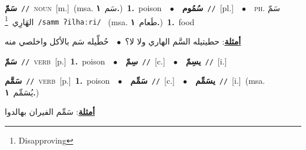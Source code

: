\documentclass[10pt,a4paper,twoside]{article} %
\begin{document}
\begin{multicols}{2}
{\setlength\topsep{0pt}\textbf{\foreignlanguage{arabic}{سَمّ}}\ {\color{gray}\texttt{//}\color{black}}\ \textsc{noun}\ [m.]\ \color{gray}(msa. \foreignlanguage{arabic}{سَم}~\foreignlanguage{arabic}{\textbf{١.}})\color{black}\ \textbf{1.}~poison\ \ $\bullet$\ \ \setlength\topsep{0pt}\textbf{\foreignlanguage{arabic}{سُمُوم}}\ {\color{gray}\texttt{//}\color{black}}\ [pl.]\ \ $\bullet$\ \ \textsc{ph.} \color{gray} \foreignlanguage{arabic}{سَمّ الهَارِي}\color{black}\ \footnote{Disapproving}\ {\color{gray}\texttt{/{\sffamily samm ʔilhaːri}/}\color{black}}\ \color{gray} (msa. \foreignlanguage{arabic}{طَعام}~\foreignlanguage{arabic}{\textbf{١.}})\color{black}\ \textbf{1.}~food\  \begin{flushright}\color{gray}\foreignlanguage{arabic}{\textbf{\underline{\foreignlanguage{arabic}{أمثلة}}}: حطيتيله السَّم الهاري ولا لا؟\ $\bullet$\ \  حُطِّيله سَم بالأكل واخلصي منه}\end{flushright}\color{black}} \vspace{2mm}

{\setlength\topsep{0pt}\textbf{\foreignlanguage{arabic}{سَمّ}}\ {\color{gray}\texttt{//}\color{black}}\ \textsc{verb}\ [p.]\ \textbf{1.}~poison\ \ $\bullet$\ \ \setlength\topsep{0pt}\textbf{\foreignlanguage{arabic}{سِمّ}}\ {\color{gray}\texttt{//}\color{black}}\ [c.]\ \ $\bullet$\ \ \setlength\topsep{0pt}\textbf{\foreignlanguage{arabic}{يسِمّ}}\ {\color{gray}\texttt{//}\color{black}}\ [i.]\ } \vspace{2mm}

{\setlength\topsep{0pt}\textbf{\foreignlanguage{arabic}{سَمَّم}}\ {\color{gray}\texttt{//}\color{black}}\ \textsc{verb}\ [p.]\ \textbf{1.}~poison\ \ $\bullet$\ \ \setlength\topsep{0pt}\textbf{\foreignlanguage{arabic}{سَمِّم}}\ {\color{gray}\texttt{//}\color{black}}\ [c.]\ \ $\bullet$\ \ \setlength\topsep{0pt}\textbf{\foreignlanguage{arabic}{يسَمِّم}}\ {\color{gray}\texttt{//}\color{black}}\ [i.]\ \color{gray}(msa. \foreignlanguage{arabic}{يُسَمِّم}~\foreignlanguage{arabic}{\textbf{١.}})\color{black}\  \begin{flushright}\color{gray}\foreignlanguage{arabic}{\textbf{\underline{\foreignlanguage{arabic}{أمثلة}}}: سَمِّم الفيران بهالدوا}\end{flushright}\color{black}} \vspace{2mm}


\end{multicols}
\end{document}
